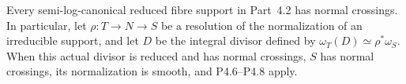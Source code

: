
\begin{proposition}[P4.25]\hypertarget{tag-02WX}{}\label{night:P4.25}\label{stmt:P4.25}


Every semi-log-canonical reduced fibre support in
Part~4.2 has normal crossings. In particular, let
$\rho:T\to N\to S$ be a resolution of the normalization
of an irreducible support, and let $D$ be the integral
divisor defined by
$\omega_T(D)\simeq\rho^*\omega_S$. When this actual
divisor is reduced and has normal crossings, $S$
has normal crossings, its normalization is smooth,
and P4.6--P4.8 apply.
\end{proposition}

